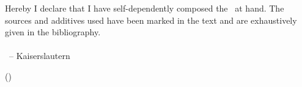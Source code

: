 %
\thispagestyle{empty}
\vspace*{15cm}

Hereby I declare that I have self-dependently composed the \RRLABVARtype\ at hand. The sources and additives used have been marked in the text and are exhaustively given in the bibliography.\\
\ \\
\RRLABVARdeclarationdate \ -- Kaiserslautern

\vspace{3cm}

(\RRLABVARauthor )
